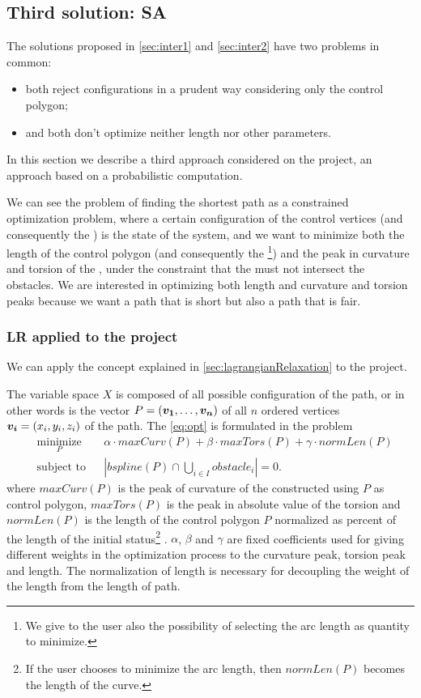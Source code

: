 \documentclass[dissertation.tex]{subfiles}
\begin{document}
\subsection{Third solution: \acf{SA}}\label{sec:inter3}
The solutions proposed in \cref{sec:inter1} and \cref{sec:inter2} have two
problems in common:
\begin{itemize}
\item both reject configurations in a prudent way
  considering only the control polygon;
\item and both don't optimize neither
  length nor other parameters.
\end{itemize}
In this section we describe a third
approach considered on the project, an approach based on a
probabilistic computation.
    
We can see the problem of finding the shortest path as a constrained
optimization problem, where a certain configuration of the control
vertices (and
consequently the \bs) is the state of the system, and we want to
minimize both the length of the control polygon (and consequently the
\bs\footnote{We give to the user also the possibility of selecting the
  arc length as quantity to minimize.}) and the peak in curvature and torsion of the \bs, under
the constraint that the \bs must not intersect the obstacles. We
are interested in optimizing both length and curvature and torsion
peaks because we want a path that is short but also a path that is
fair.

\subsubsection{\acf{LR} applied to the project}
We can apply the concept explained in \cref{sec:lagrangianRelaxation}
to the project.

The variable space $X$ is composed of all possible
configuration of the path, or in other words is the vector
$P=(\boldsymbol{v_1},\dots,\boldsymbol{v_n})$ of all $n$ ordered
vertices $\boldsymbol{v_i}=(x_i,y_i,z_i)$ of the
path. The \cref{eq:opt} is formulated in the problem
\begin{equation*}
  \begin{aligned}
    & \underset{P}{\text{minimize}}
    & & \alpha\cdot maxCurv(P)+\beta\cdot
    maxTors(P)+\gamma\cdot normLen(P) \\
    & \text{subject to}
    & & \left|bspline(P)\cap \bigcup_{i\in I}obstacle_i\right| = 0.
  \end{aligned}
\end{equation*}
where $maxCurv(P)$ is the peak of curvature of the \bs
constructed using $P$ as control polygon,
$maxTors(P)$ is the peak in absolute value of the torsion and
$normLen(P)$ is the length of the control polygon
$P$ normalized as percent of the length of the initial
status\footnote{If the user chooses to minimize the
  arc length, then $normLen(P)$ becomes the length of the \bs curve.}
. $\alpha$, $\beta$ and $\gamma$ are fixed
coefficients used for giving different weights in the optimization
process to 
the curvature peak, torsion peak and length. The normalization of
length is necessary for decoupling the weight of the length from the
length of path.
\end{document}
